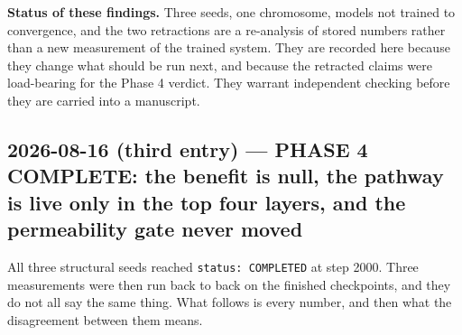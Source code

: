 \documentclass[11pt,a4paper]{article}
\newcommand{\code}[1]{\texttt{\small #1}}
\begin{document}
\textbf{Status of these findings.} Three seeds, one chromosome, models not
trained to convergence, and the two retractions are a re-analysis of stored
numbers rather than a new measurement of the trained system. They are recorded
here because they change what should be run next, and because the retracted
claims were load-bearing for the Phase 4 verdict. They warrant independent
checking before they are carried into a manuscript.

\subsection*{2026-08-16 (third entry) --- PHASE 4 COMPLETE: the benefit is null,
the pathway is live only in the top four layers, and the permeability gate never
moved}

All three structural seeds reached \code{status: COMPLETED} at step 2000. Three
measurements were then run back to back on the finished checkpoints, and they do
not all say the same thing. What follows is every number, and then what the
disagreement between them means.
\end{document}
